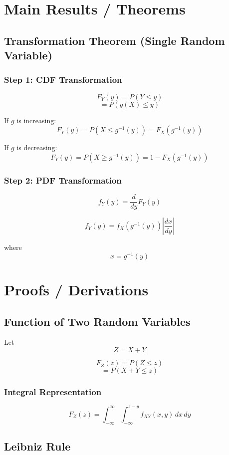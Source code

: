 \documentclass[11pt]{article}
\begin{document}
\section{Main Results / Theorems}

\subsection{Transformation Theorem (Single Random Variable)}

\subsubsection*{Step 1: CDF Transformation}

\[
F_Y(y) = P(Y \le y)
\]
\[
= P(g(X) \le y)
\]

If $g$ is increasing:
\[
F_Y(y) = P(X \le g^{-1}(y))
= F_X(g^{-1}(y))
\]

If $g$ is decreasing:
\[
F_Y(y) = P(X \ge g^{-1}(y))
= 1 - F_X(g^{-1}(y))
\]

\subsubsection*{Step 2: PDF Transformation}

\[
f_Y(y) = \frac{d}{dy}F_Y(y)
\]

\[
f_Y(y) = f_X(g^{-1}(y)) \left| \frac{dx}{dy} \right|
\]

where
\[
x = g^{-1}(y)
\]

\section{Proofs / Derivations}

\subsection{Function of Two Random Variables}

Let
\[
Z = X + Y
\]

\[
F_Z(z) = P(Z \le z)
\]
\[
= P(X + Y \le z)
\]

\subsubsection*{Integral Representation}

\[
F_Z(z) =
\int_{-\infty}^{\infty}
\int_{-\infty}^{z-y}
f_{XY}(x,y)\,dx\,dy
\]

\subsection{Leibniz Rule}
\end{document}
